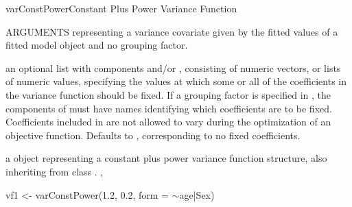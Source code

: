 \documentclass[pdftex]{article} \usepackage{url,graphicx}
\renewcommand{\Twiddle}{\mbox{\(\sim\)}}
\begin{document}
\begin{Helpfile}{varConstPower}{Constant Plus Power Variance Function}
\begin{Argument}{ARGUMENTS}
  \Co{\Twiddle fitted(.)} representing a variance covariate given by
  the fitted values of a fitted model object and no grouping factor.
\item[\Co{fixed:}]
an optional list with components  and/or
, consisting of numeric vectors, or lists of numeric
values, specifying the values at which some or all of the
coefficients in the variance function should be fixed. If a grouping
factor is specified in , the components of 
must have names identifying which coefficients are to be
fixed. Coefficients included in  are not allowed to vary
during the optimization of an objective function. Defaults to
, corresponding to no fixed coefficients.
\end{Argument}
a  object representing a constant plus power
variance function structure, also inheriting from class
.
, 
\need 15pt
\vspace{-16pt} 
\begin{Example}
vf1 <- varConstPower(1.2, 0.2, form = \Twiddle age|Sex)
\end{Example}
\end{Helpfile}
\end{document}
